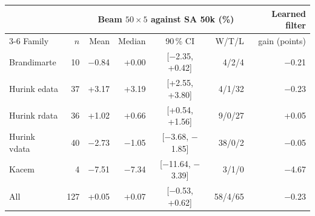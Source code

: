 \begin{tabular}{@{}lrrrcrr@{}}
\toprule
 & & \multicolumn{4}{c}{Beam $50 \times 5$ against SA 50k (\%)} & Learned filter \\
\cmidrule(lr){3-6}
Family & $n$ & Mean & Median & 90\,\% CI & W/T/L & gain (points) \\
\midrule
Brandimarte & 10 & $-$0.84 & +0.00 & [$-$2.35, +0.42] & 4/2/4 & $-$0.21 \\
Hurink edata & 37 & +3.17 & +3.19 & [+2.55, +3.80] & 4/1/32 & $-$0.23 \\
Hurink rdata & 36 & +1.02 & +0.66 & [+0.54, +1.56] & 9/0/27 & +0.05 \\
Hurink vdata & 40 & $-$2.73 & $-$1.05 & [$-$3.68, $-$1.85] & 38/0/2 & $-$0.05 \\
Kacem & 4 & $-$7.51 & $-$7.34 & [$-$11.64, $-$3.39] & 3/1/0 & $-$4.67 \\
\midrule
All & 127 & +0.05 & +0.07 & [$-$0.53, +0.62] & 58/4/65 & $-$0.23 \\
\bottomrule
\end{tabular}
